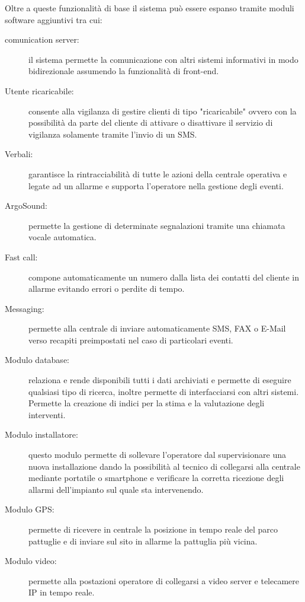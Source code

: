 Oltre a queste funzionalità di base il sistema può essere espanso tramite moduli software aggiuntivi tra cui:
\begin{description}
	\item[comunication server:] il sistema permette la comunicazione con altri sistemi informativi in modo bidirezionale assumendo la funzionalità di front-end.
	\item[Utente ricaricabile:] consente alla vigilanza di gestire clienti di tipo "ricaricabile" ovvero con la possibilità da parte del cliente di attivare o disattivare il servizio di vigilanza solamente tramite l'invio di un SMS.
	\item[Verbali:] garantisce la rintracciabilità di tutte le azioni della centrale operativa e legate ad un allarme e supporta l'operatore nella gestione degli eventi.
	\item[ArgoSound:] permette la gestione di determinate segnalazioni tramite una chiamata vocale automatica.
	\item[Fast call:] compone automaticamente un numero dalla lista dei contatti del cliente in allarme evitando errori o perdite di tempo.
	\item[Messaging:] permette alla centrale di inviare automaticamente SMS, FAX o E-Mail verso recapiti preimpostati nel caso di particolari eventi.
	\item[Modulo database:] relaziona e rende disponibili tutti i dati archiviati e permette di eseguire qualsiasi tipo di ricerca, inoltre permette di interfacciarsi con altri sistemi. Permette la creazione di indici per la stima e la valutazione degli interventi.
	\item[Modulo installatore:] questo modulo permette di sollevare l'operatore dal supervisionare una nuova installazione dando la possibilità al tecnico di collegarsi alla centrale mediante portatile o smartphone e verificare la corretta ricezione degli allarmi dell'impianto sul quale sta intervenendo.
	\item[Modulo GPS:] permette di ricevere in centrale la posizione in tempo reale del parco pattuglie e di inviare sul sito in allarme la pattuglia più vicina.
	\item[Modulo video:] permette alla postazioni operatore di collegarsi a video server e telecamere IP in tempo reale.
\end{description}
